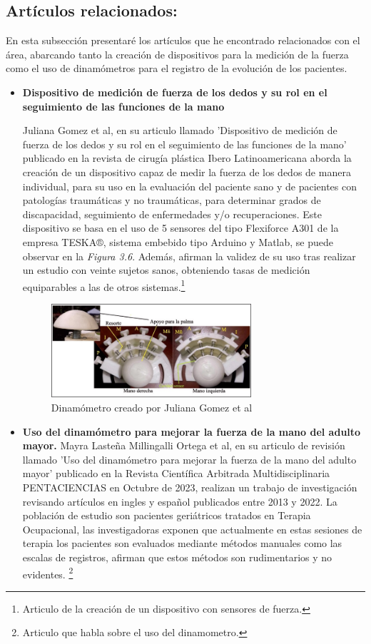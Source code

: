 \subsection{Artículos relacionados:}
En esta subsección presentaré los artículos que he encontrado relacionados con el área, abarcando tanto la creación de dispositivos para la medición de la fuerza como el uso de dinamómetros para el registro de la evolución de los pacientes.
\begin{itemize}
    \item \textbf{Dispositivo de medición de fuerza de los dedos y su
rol en el seguimiento de las funciones de la mano}

Juliana Gomez et al, en su articulo llamado 'Dispositivo de medición de fuerza de los dedos y su rol en el seguimiento de las funciones de la mano' publicado en la revista de cirugía plástica Ibero Latinoamericana aborda la creación de un dispositivo capaz de medir la fuerza de los dedos de manera individual, para su uso en la evaluación del paciente sano y de pacientes con patologías traumáticas y no traumáticas, para determinar grados de discapacidad, seguimiento de enfermedades y/o recuperaciones. 
Este dispositivo se basa en el uso de 5 sensores del tipo Flexiforce A301 de la empresa TESKA®, sistema embebido
tipo Arduino y Matlab, se puede observar en la \textit{Figura 3.6}. Además, afirman la validez de su uso tras realizar un estudio con veinte sujetos sanos, obteniendo tasas de medición equiparables a las de otros sistemas.\cite{GOMEZ2022}\footnote{Articulo de la creación de un dispositivo con sensores de fuerza\cite{GOMEZ2022}.}
    \begin{figure}[h]
        \centering
        \includegraphics[width=0.7\textwidth]{img/dispositivo Revista.jpg}
        \caption{Dinamómetro creado por Juliana Gomez et al}
        \label{fig:activforce}
    \end{figure}
    \item \textbf{Uso del dinamómetro para mejorar la fuerza de la mano del adulto mayor.}
    Mayra Lasteña Millingalli Ortega et al, en su articulo de revisión llamado 'Uso del dinamómetro para mejorar la fuerza de la mano del adulto mayor' publicado en la Revista Científica Arbitrada Multidisciplinaria PENTACIENCIAS en Octubre de 2023, realizan un trabajo de investigación revisando artículos en ingles y español publicados entre 2013 y 2022.
    La población de estudio son pacientes geriátricos tratados en Terapia Ocupacional, las investigadoras exponen que actualmente en estas sesiones de terapia los pacientes son evaluados mediante métodos manuales como las escalas de registros, afirman que estos métodos son rudimentarios y no evidentes. \cite{Articulo_din}\footnote{Articulo que habla sobre el uso del dinamometro\cite{Articulo_din}.}
\end{itemize} 
